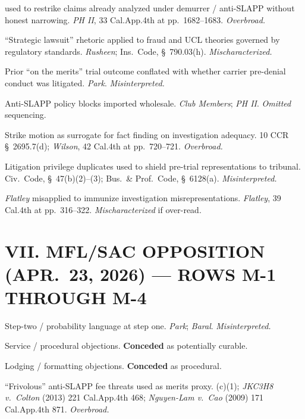\begin{description}
\tightlist
\item[S-1.]  used to restrike claims already analyzed under demurrer / anti-SLAPP without honest narrowing. \textit{PH II}, 33 Cal.App.4th at pp.\ 1682--1683. \textit{Overbroad.}
\item[S-2.] ``Strategic lawsuit'' rhetoric applied to fraud and UCL theories governed by regulatory standards. \textit{Rusheen}; Ins.\ Code, \S~790.03(h). \textit{Mischaracterized.}
\item[S-3.] Prior ``on the merits'' trial outcome conflated with whether carrier pre-denial conduct was litigated. \textit{Park}. \textit{Misinterpreted.}
\item[S-4.] Anti-SLAPP policy blocks imported wholesale. \textit{Club Members}; \textit{PH II}. \textit{Omitted} sequencing.
\item[S-5.] Strike motion as surrogate for fact finding on investigation adequacy. 10 CCR \S~2695.7(d); \textit{Wilson}, 42 Cal.4th at pp.\ 720--721. \textit{Overbroad.}
\item[S-6.] Litigation privilege duplicates used to shield pre-trial representations to tribunal. Civ.\ Code, \S~47(b)(2)--(3); Bus.\ \& Prof.\ Code, \S~6128(a). \textit{Misinterpreted.}
\item[S-7.] \textit{Flatley} misapplied to immunize investigation misrepresentations. \textit{Flatley}, 39 Cal.4th at pp.\ 316--322. \textit{Mischaracterized} if over-read.
\end{description}

\section*{VII. MFL/SAC OPPOSITION (APR.\ 23, 2026) --- ROWS M-1 THROUGH M-4}

\begin{description}
\tightlist
\item[M-1.] Step-two / probability language at step one. \textit{Park}; \textit{Baral}. \textit{Misinterpreted.}
\item[M-2.] Service / procedural objections. \textbf{Conceded} as potentially curable.
\item[M-3.] Lodging / formatting objections. \textbf{Conceded} as procedural.
\item[M-4.] ``Frivolous'' anti-SLAPP fee threats used as merits proxy. (c)(1); \textit{JKC3H8 v.\ Colton} (2013) 221 Cal.App.4th 468; \textit{Nguyen-Lam v.\ Cao} (2009) 171 Cal.App.4th 871. \textit{Overbroad.}
\end{description}

